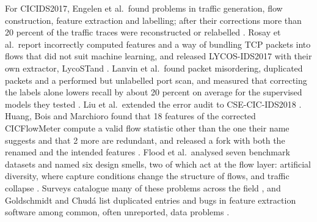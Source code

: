 \documentclass[pdflatex,sn-mathphys-num]{sn-jnl}
\newcommand{\litnum}[1]{#1}
\newcommand{\cicids}{CICIDS2017}
\theoremstyle{thmstyleone}%
\theoremstyle{thmstylethree}%
\begin{document}
For \cicids, Engelen et al.\ found problems in traffic generation, flow construction, feature extraction and labelling; after their corrections more than \litnum{20} percent of the traffic traces were reconstructed or relabelled \cite{engelen2021}. Rosay et al.\ report incorrectly computed features and a way of bundling TCP packets into flows that did not suit machine learning, and released LYCOS-IDS2017 with their own extractor, LycoSTand \cite{rosay2021,rosay2022}. Lanvin et al.\ found packet misordering, duplicated packets and a performed but unlabelled port scan, and measured that correcting the labels alone lowers recall by about \litnum{20} percent on average for the supervised models they tested \cite{lanvin2023}. Liu et al.\ extended the error audit to CSE-CIC-IDS2018 \cite{liu2022}. Huang, Bois and Marchioro found that \litnum{18} features of the corrected CICFlowMeter compute a valid flow statistic other than the one their name suggests and that \litnum{2} more are redundant, and released a fork with both the renamed and the intended features \cite{huang2026}. Flood et al.\ analysed seven benchmark datasets and named six design smells, two of which act at the flow layer: artificial diversity, where capture conditions change the structure of flows, and traffic collapse \cite{flood2024}. Surveys catalogue many of these problems across the field \cite{goldschmidt2025,bonninghausen2024}, and Goldschmidt and Chud\'a list duplicated entries and bugs in feature extraction software among common, often unreported, data problems \cite{goldschmidt2025}.
\end{document}
